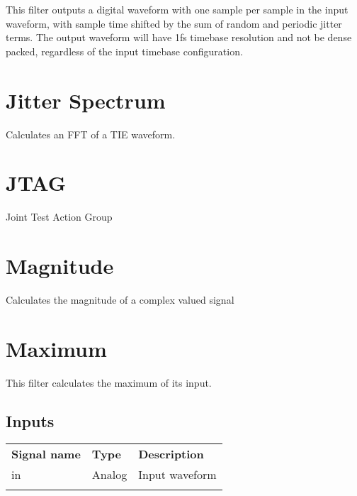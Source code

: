 This filter outputs a digital waveform with one sample per sample in the input waveform, with sample time shifted by
the sum of random and periodic jitter terms. The output waveform will have 1fs timebase resolution and not be dense
packed, regardless of the input timebase configuration.

\pagebreak
\section{Jitter Spectrum}

Calculates an FFT of a TIE waveform.

\pagebreak
\section{JTAG}

Joint Test Action Group

\pagebreak
\section{Magnitude}

Calculates the magnitude of a complex valued signal

\pagebreak
\section{Maximum}
\label{filter:maximum}

This filter calculates the maximum of its input.

\subsection{Inputs}
\begin{tabularx}{16cm}{llX}
\thickhline
\textbf{Signal name} & \textbf{Type} & \textbf{Description} \\
\thickhline
in & Analog & Input waveform \\
\thickhline
\end{tabularx}

